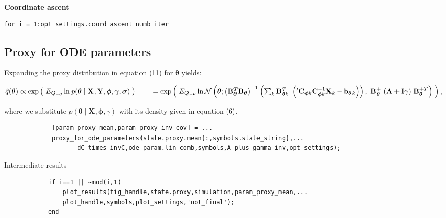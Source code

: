 \textbf{Coordinate ascent}

\color{RoyalPurple}\begin{verbatim}
for i = 1:opt_settings.coord_ascent_numb_iter
\end{verbatim}
\color{black}

\subsection{Proxy for ODE parameters}


\begin{par}
Expanding the proxy distribution in equation (11) for $\boldsymbol{\theta}$ yields:
\end{par} \vspace{1em}

\begin{par}
$\hat{q}(\mathbf{\boldsymbol\theta}) \propto \exp
\left( ~E_{Q_{-\boldsymbol\theta}}     \ln p(\boldsymbol\theta \mid \mathbf{X},\mathbf{Y},\boldsymbol\phi,\gamma,\boldsymbol\sigma)
~     \right) \\ \qquad= \exp \left( ~E_{Q_{-\boldsymbol{\theta}}} \ln \mathcal{N}\left(\boldsymbol{\theta}
; \left(    \mathbf{B}_{\boldsymbol{\theta}}^T \mathbf{B}_{\boldsymbol{\theta}} \right)^{-1}
\left( \sum_k    \mathbf{B}_{\boldsymbol{\theta} k}^T ~ \left( {'\mathbf{C}_{\boldsymbol{\phi}
k}}    \mathbf{C}_{\boldsymbol{\phi} k}^{-1} \mathbf{X}_k - \mathbf{b}_{\boldsymbol{\theta}
k} \right)    \right), ~ \mathbf{B}_{\boldsymbol{\theta}}^+ ~ (\mathbf{A} + \mathbf{I}\gamma)
~    \mathbf{B}_{\boldsymbol{\theta}}^{+T} \right) ~\right)$,
\end{par} \vspace{1em}

where we substitute $p(\boldsymbol{\theta} \mid \mathbf{X},\boldsymbol{\phi},\gamma)$ with its density given in equation (6).
    \color{RoyalPurple}\begin{verbatim}
             [param_proxy_mean,param_proxy_inv_cov] = ...
             proxy_for_ode_parameters(state.proxy.mean{:,symbols.state_string},...
                    dC_times_invC,ode_param.lin_comb,symbols,A_plus_gamma_inv,opt_settings);
\end{verbatim}
\color{black}
\begin{par}
Intermediate results
\end{par} \vspace{1em}
\color{RoyalPurple}\begin{verbatim}
            if i==1 || ~mod(i,1)
                plot_results(fig_handle,state.proxy,simulation,param_proxy_mean,...
                plot_handle,symbols,plot_settings,'not_final');
            end
\end{verbatim}
\color{black}

